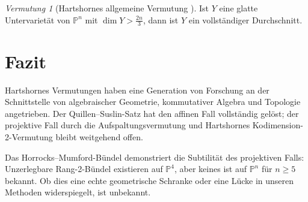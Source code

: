 \documentclass[12pt,a4paper]{amsart}
\theoremstyle{definition}
\theoremstyle{remark}
\newtheorem{vermutung}[theorem]{Vermutung}
\newcommand{\PP}{\mathbb{P}}
\begin{document}
\begin{vermutung}[Hartshornes allgemeine Vermutung \cite{Hartshorne1974}]
Ist $Y$ eine glatte Untervarietät von $\PP^n$ mit $\dim Y > \tfrac{2n}{3}$,
dann ist $Y$ ein vollständiger Durchschnitt.
\end{vermutung}

\section{Fazit}

Hartshornes Vermutungen haben eine Generation von Forschung an der
Schnittstelle von algebraischer Geometrie, kommutativer Algebra und Topologie
angetrieben.  Der Quillen--Suslin-Satz hat den affinen Fall vollständig
gelöst; der projektive Fall durch die Aufspaltungsvermutung und Hartshornes
Kodimension-2-Vermutung bleibt weitgehend offen.

Das Horrocks--Mumford-Bündel demonstriert die Subtilität des projektiven
Falls: Unzerlegbare Rang-2-Bündel existieren auf $\PP^4$, aber keines ist
auf $\PP^n$ für $n \ge 5$ bekannt.  Ob dies eine echte geometrische Schranke
oder eine Lücke in unseren Methoden widerspiegelt, ist unbekannt.
\end{document}
